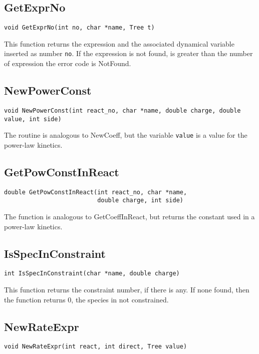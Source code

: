 \subsection{GetExprNo}
\begin{verbatim} 
void GetExprNo(int no, char *name, Tree t) 
\end{verbatim}

This function returns the expression and the associated dynamical
variable inserted as number {\tt no}.
If the expression is not found,  is greater than the 
number of expression the error code is NotFound.

\subsection{NewPowerConst}
\begin{verbatim}
void NewPowerConst(int react_no, char *name, double charge, double
value, int side)
\end{verbatim}

The routine is analogous to NewCoeff, but the variable {\tt value} is a value 
for the power-law kinetics.

\subsection{GetPowConstInReact}
\begin{verbatim}
double GetPowConstInReact(int react_no, char *name, 
                          double charge, int side)
\end{verbatim}

The function is analogous to GetCoeffInReact, but returns the constant
used in a power-law kinetics.

\subsection{IsSpecInConstraint}
\begin{verbatim}
int IsSpecInConstraint(char *name, double charge)
\end{verbatim}

This function returns the constraint number, if there is any. If none
found, then the function returns 0, \ie the species in not
constrained.

\subsection{NewRateExpr}
\begin{verbatim}
void NewRateExpr(int react, int direct, Tree value)
\end{verbatim}

